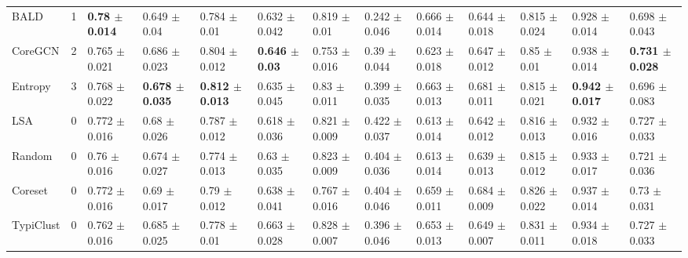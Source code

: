 \documentclass[]{article}
\begin{document}
\begin{table}[H]
{\begin{tabular}{l|llllllllllll}
			BALD & 1 & \textbf{0.78 $\pm$ {\small 0.014}} & 0.649 $\pm$ {\small 0.04} & 0.784 $\pm$ {\small 0.01} & 0.632 $\pm$ {\small 0.042} & 0.819 $\pm$ {\small 0.01} & 0.242 $\pm$ {\small 0.046} & 0.666 $\pm$ {\small 0.014} & 0.644 $\pm$ {\small 0.018} & 0.815 $\pm$ {\small 0.024} & 0.928 $\pm$ {\small 0.014} & 0.698 $\pm$ {\small 0.043}\\
			
			CoreGCN & 2 & 0.765 $\pm$ {\small 0.021} & 0.686 $\pm$ {\small 0.023} & 0.804 $\pm$ {\small 0.012} & \textbf{0.646 $\pm$ {\small 0.03}} & 0.753 $\pm$ {\small 0.016} & 0.39 $\pm$ {\small 0.044} & 0.623 $\pm$ {\small 0.018} & 0.647 $\pm$ {\small 0.012} & 0.85 $\pm$ {\small 0.01} & 0.938 $\pm$ {\small 0.014} & \textbf{0.731 $\pm$ {\small 0.028}}\\
			
			Entropy & 3 & 0.768 $\pm$ {\small 0.022} & \textbf{0.678 $\pm$ {\small 0.035}} & \textbf{0.812 $\pm$ {\small 0.013}} & 0.635 $\pm$ {\small 0.045} & 0.83 $\pm$ {\small 0.011} & 0.399 $\pm$ {\small 0.035} & 0.663 $\pm$ {\small 0.013} & 0.681 $\pm$ {\small 0.011} & 0.815 $\pm$ {\small 0.021} & \textbf{0.942 $\pm$ {\small 0.017}} & 0.696 $\pm$ {\small 0.083}\\
			
			LSA & 0 & 0.772 $\pm$ {\small 0.016} & 0.68 $\pm$ {\small 0.026} & 0.787 $\pm$ {\small 0.012} & 0.618 $\pm$ {\small 0.036} & 0.821 $\pm$ {\small 0.009} & 0.422 $\pm$ {\small 0.037} & 0.613 $\pm$ {\small 0.014} & 0.642 $\pm$ {\small 0.012} & 0.816 $\pm$ {\small 0.013} & 0.932 $\pm$ {\small 0.016} & 0.727 $\pm$ {\small 0.033}\\
			
			Random & 0 & 0.76 $\pm$ {\small 0.016} & 0.674 $\pm$ {\small 0.027} & 0.774 $\pm$ {\small 0.013} & 0.63 $\pm$ {\small 0.035} & 0.823 $\pm$ {\small 0.009} & 0.404 $\pm$ {\small 0.036} & 0.613 $\pm$ {\small 0.014} & 0.639 $\pm$ {\small 0.013} & 0.815 $\pm$ {\small 0.012} & 0.933 $\pm$ {\small 0.017} & 0.721 $\pm$ {\small 0.036}\\
			
			Coreset & 0 & 0.772 $\pm$ {\small 0.016} & 0.69 $\pm$ {\small 0.017} & 0.79 $\pm$ {\small 0.012} & 0.638 $\pm$ {\small 0.041} & 0.767 $\pm$ {\small 0.016} & 0.404 $\pm$ {\small 0.046} & 0.659 $\pm$ {\small 0.011} & 0.684 $\pm$ {\small 0.009} & 0.826 $\pm$ {\small 0.022} & 0.937 $\pm$ {\small 0.014} & 0.73 $\pm$ {\small 0.031}\\
			
			TypiClust & 0 & 0.762 $\pm$ {\small 0.016} & 0.685 $\pm$ {\small 0.025} & 0.778 $\pm$ {\small 0.01} & 0.663 $\pm$ {\small 0.028} & 0.828 $\pm$ {\small 0.007} & 0.396 $\pm$ {\small 0.046} & 0.653 $\pm$ {\small 0.013} & 0.649 $\pm$ {\small 0.007} & 0.831 $\pm$ {\small 0.011} & 0.934 $\pm$ {\small 0.018} & 0.727 $\pm$ {\small 0.033}\\
		\end{tabular}
	}
\end{table}
\end{document}
